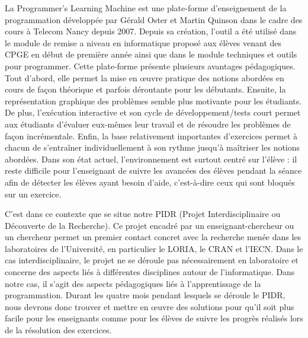 La Programmer's Learning Machine\cite{PLMQuinson} est une plate-forme d'enseignement de la programmation développée par Gérald Oster et Martin Quinson dans le cadre des cours à Telecom Nancy depuis 2007. Depuis sa création, l'outil a été utilisé dans le module de remise a niveau en informatique proposé aux élèves venant des CPGE en début de première année ainsi que dans le module \og techniques et outils pour programmer\fg{}. Cette plate-forme présente plusieurs avantages pédagogiques. Tout d'abord, elle permet la mise en œuvre pratique des notions abordées en cours de façon théorique et parfois déroutante pour les débutants. Ensuite, la représentation graphique des problèmes semble plus motivante pour les étudiants. De plus, l'exécution interactive et son cycle de développement/tests court permet aux étudiants d'évaluer eux-mêmes leur travail et de résoudre les problèmes de façon incrémentale. Enfin, la base relativement importantes d'exercices permet à chacun de s'entraîner individuellement à son rythme jusqu'à maîtriser les notions abordées. Dans son état actuel, l'environnement est surtout centré sur l'élève : il reste difficile pour l'enseignant de suivre les avancées des élèves pendant la séance afin de détecter les élèves ayant besoin d'aide, c'est-à-dire ceux qui sont bloqués sur un exercice.

C'est dans ce contexte que se situe notre PIDR (Projet Interdisciplinaire ou Découverte de la Recherche). Ce projet encadré par un enseignant-chercheur ou un chercheur permet un premier contact concret avec la recherche menée dans les laboratoires de l'Université, en particulier le LORIA, le CRAN et l'IECN. Dans le cas interdisciplinaire, le projet ne se déroule pas nécessairement en laboratoire et concerne des aspects liés à différentes disciplines autour de l'informatique. Dans notre cas, il s'agit des aspects pédagogiques liés à l'apprentissage de la programmation. Durant les quatre mois pendant lesquels se déroule le PIDR, nous devrons donc trouver et mettre en œuvre des solutions pour qu'il soit plus facile pour les enseignants comme pour les élèves de suivre les progrès réalisés lors de la résolution des exercices.
